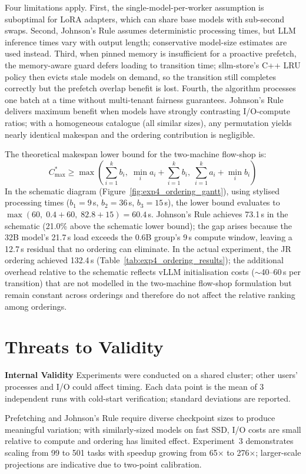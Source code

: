 \documentclass[logo,bsc,singlespacing,parskip,online]{infthesis}
\begin{document}
Four limitations apply. First, the single-model-per-worker assumption is suboptimal for LoRA adapters, which can share base models with sub-second swaps. Second, Johnson's Rule assumes deterministic processing times, but LLM inference times vary with output length; conservative model-size estimates are used instead. Third, when pinned memory is insufficient for a proactive prefetch, the memory-aware guard defers loading to transition time; sllm-store's C++ LRU policy then evicts stale models on demand, so the transition still completes correctly but the prefetch overlap benefit is lost. Fourth, the algorithm processes one batch at a time without multi-tenant fairness guarantees. Johnson's Rule delivers maximum benefit when models have strongly contrasting I/O-compute ratios; with a homogeneous catalogue (all similar sizes), any permutation yields nearly identical makespan and the ordering contribution is negligible.

The theoretical makespan lower bound for the two-machine flow-shop is:
$$C_{\max}^* \geq \max\left(\sum_{i=1}^k b_i,\; \min_i a_i + \sum_{i=1}^k b_i,\; \sum_{i=1}^k a_i + \min_i b_i\right)$$
In the schematic diagram (Figure~\ref{fig:exp4_ordering_gantt}), using stylised processing times ($b_1=9$\,s, $b_2=36$\,s, $b_3=15$\,s), the lower bound evaluates to $\max(60,\; 0.4+60,\; 82.8+15) = 60.4$\,s. Johnson's Rule achieves 73.1\,s in the schematic (21.0\% above the schematic lower bound); the gap arises because the 32B model's 21.7\,s load exceeds the 0.6B group's 9\,s compute window, leaving a 12.7\,s residual that no ordering can eliminate. In the actual experiment, the JR ordering achieved 132.4\,s (Table~\ref{tab:exp4_ordering_results}); the additional overhead relative to the schematic reflects vLLM initialisation costs ($\sim$40--60\,s per transition) that are not modelled in the two-machine flow-shop formulation but remain constant across orderings and therefore do not affect the relative ranking among orderings.

\section{Threats to Validity}

\textbf{Internal Validity}
Experiments were conducted on a shared cluster; other users' processes and I/O could affect timing. Each data point is the mean of 3 independent runs with cold-start verification; standard deviations are reported.

Prefetching and Johnson's Rule require diverse checkpoint sizes to produce meaningful variation; with similarly-sized models on fast SSD, I/O costs are small relative to compute and ordering has limited effect. Experiment~3 demonstrates scaling from 99 to 501 tasks with speedup growing from 65$\times$ to 276$\times$; larger-scale projections are indicative due to two-point calibration.
\end{document}
